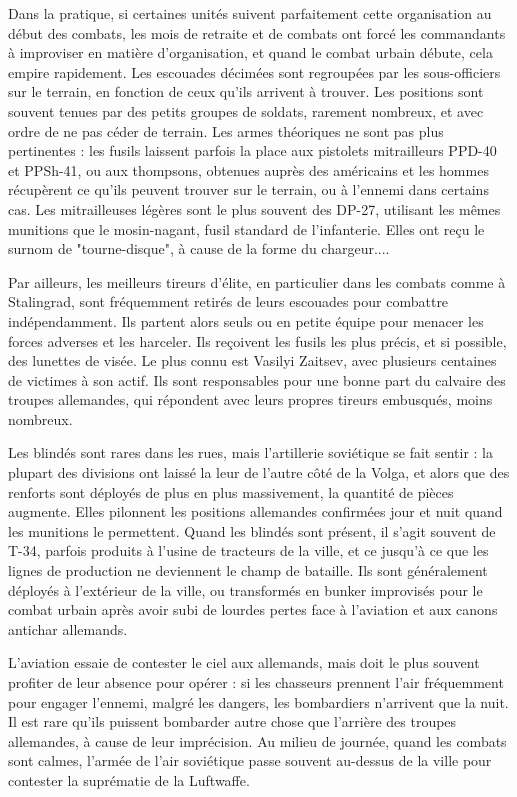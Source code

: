 \documentclass{report}
\begin{document}
\begin{multicols}{2}
Dans la pratique, si certaines unités suivent parfaitement cette organisation au début des combats, les mois de retraite et de combats ont forcé les commandants à improviser en matière d'organisation, et quand le combat urbain débute, cela empire rapidement. Les escouades décimées sont regroupées par les sous-officiers sur le terrain, en fonction de ceux qu'ils arrivent à trouver. Les positions sont souvent tenues par des petits groupes de soldats, rarement nombreux, et avec ordre de ne pas céder de terrain. Les armes théoriques ne sont pas plus pertinentes : les fusils laissent parfois la place aux pistolets mitrailleurs PPD-40 et PPSh-41, ou aux thompsons, obtenues auprès des américains et les hommes récupèrent ce qu'ils peuvent trouver sur le terrain, ou à l'ennemi dans certains cas. Les mitrailleuses légères sont le plus souvent des DP-27, utilisant les mêmes munitions que le mosin-nagant, fusil standard de l'infanterie. Elles ont reçu le surnom de "tourne-disque", à cause de la forme du chargeur....


Par ailleurs, les meilleurs tireurs d'élite, en particulier dans les combats comme à Stalingrad, sont fréquemment retirés de leurs escouades pour combattre indépendamment. Ils partent alors seuls ou en petite équipe pour menacer les forces adverses et les harceler. Ils reçoivent les fusils les plus précis, et si possible, des lunettes de visée. Le plus connu est Vasilyi Zaitsev, avec plusieurs centaines de victimes à son actif. Ils sont responsables pour une bonne part du calvaire des troupes allemandes, qui répondent avec leurs propres tireurs embusqués, moins nombreux.

Les blindés sont rares dans les rues, mais l'artillerie soviétique se fait sentir : la plupart des divisions ont laissé la leur de l'autre côté de la Volga, et alors que des renforts sont déployés de plus en plus massivement, la quantité de pièces augmente. Elles pilonnent les positions allemandes confirmées jour et nuit quand les munitions le permettent.  Quand les blindés sont présent, il s'agit souvent de T-34, parfois produits à l'usine de tracteurs de la ville, et ce jusqu'à ce que les lignes de production ne deviennent le champ de bataille. Ils sont généralement déployés à l'extérieur de la ville, ou transformés en bunker improvisés pour le combat urbain après avoir subi de lourdes pertes face à l'aviation et aux canons antichar allemands.

L'aviation essaie de contester le ciel aux allemands, mais doit le plus souvent profiter de leur absence pour opérer : si les chasseurs prennent l'air fréquemment pour engager l'ennemi, malgré les dangers, les bombardiers n'arrivent que la nuit. Il est rare qu'ils puissent bombarder autre chose que l'arrière des troupes allemandes, à cause de leur imprécision. Au milieu de journée, quand les combats sont calmes, l'armée de l'air soviétique passe souvent au-dessus de la ville pour contester la suprématie de la Luftwaffe.


\end{multicols}
\end{document}
